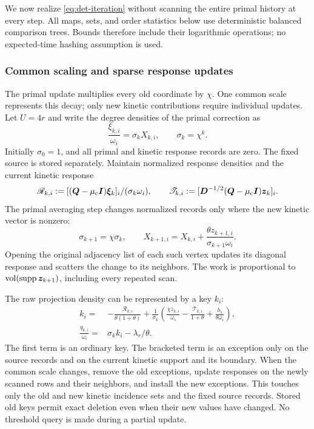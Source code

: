 We now realize \cref{eq:det-iteration} without scanning the entire primal
history at every step. All maps, sets, and order statistics below use
deterministic balanced comparison trees. Bounds therefore include their
logarithmic operations; no expected-time hashing assumption is used.

\subsubsection{Common scaling and sparse response updates}

The primal update multiplies every old coordinate by $\chi$. One common
scale represents this decay; only new kinetic contributions require
individual updates. Let $U=4r$ and write the degree densities of the primal
correction as
\begin{equation*}
 \frac{\xi_{k,i}}{\omega_i}=\sigma_k X_{k,i},\qquad
 \sigma_k=\chi^k.
\end{equation*}
Initially $\sigma_0=1$, and all primal and kinetic response records are
zero. The fixed source is stored separately.
Maintain normalized response densities and the current kinetic response
\begin{equation*}
 \mathscr R_{k,i}:=
   [(\bm{Q}-\mu_{\mathrm{c}}\bm{I})\bm{\xi}_k]_i/(\sigma_k\omega_i),
 \qquad
 \mathscr T_{k,i}:=
   [\bm{D}^{-1/2}(\bm{Q}-\mu_{\mathrm{c}}\bm{I})\bm{z}_k]_i.
\end{equation*}
The primal averaging step changes normalized records only where the new
kinetic vector is nonzero:
\begin{equation*}
 \sigma_{k+1}=\chi\sigma_k,\qquad
 X_{k+1,i}=X_{k,i}+
       \frac{\theta z_{k+1,i}}{\sigma_{k+1}\omega_i}.
\end{equation*}
Opening the original adjacency list of each such vertex updates its diagonal
response and scatters the change to its neighbors. The work is proportional
to $\operatorname{vol}(\operatorname{supp}\bm{z}_{k+1})$, including every repeated scan.

The raw projection density can be represented by a key $k_i$:
\begin{equation}
 \begin{aligned}
 k_i={}&-\frac{\mathscr R_{k,i}}{\theta(1+\theta)}
       +\frac1{\sigma_k}\left(
          \frac{\chi z_{k,i}}{\omega_i}
          -\frac{\mathscr T_{k,i}}{1+\theta}
          +\frac{h_i}{\theta\omega_i}\right),\\
 \frac{q_{k,i}}{\omega_i}={}&\sigma_k k_i-\lambda_r/\theta.
 \end{aligned}
 \label{eq:det-raw-key}
\end{equation}
The first term is an ordinary key. The bracketed term is an exception only
on the source records and on the current kinetic support and its boundary.
When the common scale changes, remove the old exceptions, update responses
on the newly scanned rows and their neighbors, and install the new
exceptions. This touches only the old and new kinetic incidence sets and
the fixed source records. Stored old keys permit exact deletion even when
their new values have changed. No threshold query is made during a partial
update.


